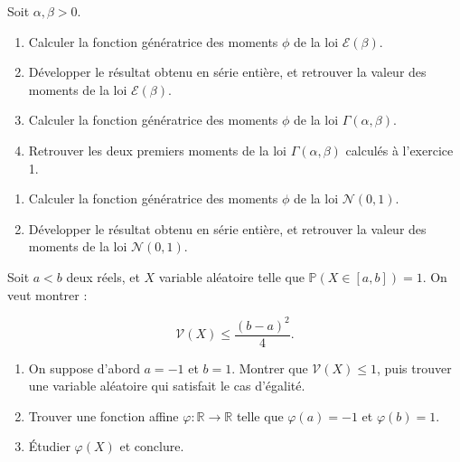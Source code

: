 \medskip

\begin{mdframed}
\begin{exercice}
Soit $\alpha, \beta > 0$.

\begin{enumerate}
    \item Calculer la fonction génératrice des moments $\phi$ de la loi $\mathcal{E}(\beta)$.
    \item Développer le résultat obtenu en série entière, et retrouver la valeur des moments de la loi $\mathcal{E}(\beta)$.
    \item Calculer la fonction génératrice des moments $\phi$ de la loi $\Gamma(\alpha, \beta)$.
    \item Retrouver les deux premiers moments de la loi $\Gamma(\alpha, \beta)$ calculés à l'exercice 1.
\end{enumerate}
\end{exercice}
\end{mdframed}

\medskip

\begin{mdframed}
\begin{exercice}
\begin{enumerate}
    \item Calculer la fonction génératrice des moments $\phi$ de la loi $\mathcal{N}(0, 1)$.
    \item Développer le résultat obtenu en série entière, et retrouver la valeur des moments de la loi $\mathcal{N}(0, 1)$.
\end{enumerate}
\end{exercice}
\end{mdframed}

\medskip

\begin{mdframed}
\begin{exercice}
Soit $a < b$ deux réels, et $X$ variable aléatoire telle que $\mathbb{P}(X \in [a, b]) = 1$. On veut montrer :

$$
\mathcal{V}(X) \leq \frac{(b - a)^2}{4}.
$$

\begin{enumerate}
    \item On suppose d'abord $a = -1$ et $b = 1$. Montrer que $\mathcal{V}(X) \leq 1$, puis trouver une variable aléatoire qui satisfait le cas d'égalité.
    \item Trouver une fonction affine $\varphi : \mathbb{R} \to \mathbb{R}$ telle que $\varphi(a) = -1$ et $\varphi(b) = 1$.
    \item Étudier $\varphi(X)$ et conclure.
\end{enumerate}
\end{exercice}
\end{mdframed}

